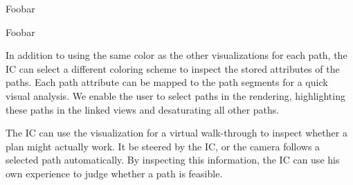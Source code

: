 \documentclass{egpubl}
\begin{document}
 Foobar

 Foobar

 In addition to using the same color as the other visualizations for each path, the IC can select a different coloring scheme to inspect the stored attributes of the paths. Each path attribute can be mapped to the path segments for a quick visual analysis. We enable the user to select paths in the rendering, highlighting these paths in the linked views and desaturating all other paths.

The IC can use the visualization for a virtual walk-through to inspect whether a plan might actually work. It be steered by the IC, or the camera follows a selected path automatically. By inspecting this information, the IC can use his own experience to judge whether a path is feasible.


\end{document}
